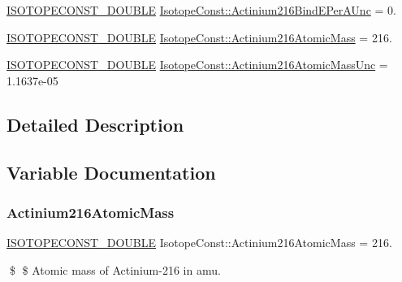 \begin{DoxyCompactItemize}
\mbox{\hyperlink{group___isotope_const-_macros_ga8f45a7272ce02c0b4c65c44636ed719a}{I\+S\+O\+T\+O\+P\+E\+C\+O\+N\+S\+T\+\_\+\+D\+O\+U\+B\+LE}} \mbox{\hyperlink{group___isotope_const-_actinium-_ac216_ga21a16760d5a938cd34e69f96d34a4146}{Isotope\+Const\+::\+Actinium216\+Bind\+E\+Per\+A\+Unc}} = 0.
\item 
\mbox{\hyperlink{group___isotope_const-_macros_ga8f45a7272ce02c0b4c65c44636ed719a}{I\+S\+O\+T\+O\+P\+E\+C\+O\+N\+S\+T\+\_\+\+D\+O\+U\+B\+LE}} \mbox{\hyperlink{group___isotope_const-_actinium-_ac216_ga48f9e2fbc8bf6f84015a5d3bc7b88cfa}{Isotope\+Const\+::\+Actinium216\+Atomic\+Mass}} = 216.
\item 
\mbox{\hyperlink{group___isotope_const-_macros_ga8f45a7272ce02c0b4c65c44636ed719a}{I\+S\+O\+T\+O\+P\+E\+C\+O\+N\+S\+T\+\_\+\+D\+O\+U\+B\+LE}} \mbox{\hyperlink{group___isotope_const-_actinium-_ac216_ga90d3f5d219e2ba45464ab57cee89872f}{Isotope\+Const\+::\+Actinium216\+Atomic\+Mass\+Unc}} = 1.\+1637e-\/05
\end{DoxyCompactItemize}


\subsection{Detailed Description}


\subsection{Variable Documentation}
\mbox{\label{group___isotope_const-_actinium-_ac216_ga48f9e2fbc8bf6f84015a5d3bc7b88cfa}} 
\subsubsection{\texorpdfstring{Actinium216\+Atomic\+Mass}{Actinium216AtomicMass}}
{\footnotesize\ttfamily \mbox{\hyperlink{group___isotope_const-_macros_ga8f45a7272ce02c0b4c65c44636ed719a}{I\+S\+O\+T\+O\+P\+E\+C\+O\+N\+S\+T\+\_\+\+D\+O\+U\+B\+LE}} Isotope\+Const\+::\+Actinium216\+Atomic\+Mass = 216.}

\$ \$ Atomic mass of Actinium-\/216 in amu. \mbox{\label{group___isotope_const-_actinium-_ac216_ga90d3f5d219e2ba45464ab57cee89872f}} 

